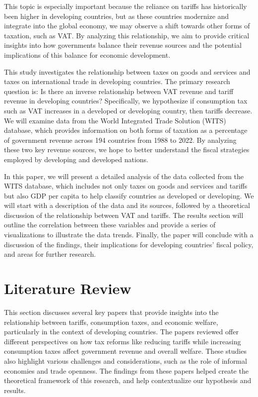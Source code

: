 \documentclass[12pt]{article}
\begin{document}
This topic is especially important because the reliance on tariffs has historically been higher in developing countries, but as these countries modernize and integrate into the global economy, we may observe a shift towards other forms of taxation, such as VAT. By analyzing this relationship, we aim to provide critical insights into how governments balance their revenue sources and the potential implications of this balance for economic development.

This study investigates the relationship between taxes on goods and services and taxes on international trade in developing countries. The primary research question is: Is there an inverse relationship between VAT revenue and tariff revenue in developing countries? Specifically, we hypothesize  if consumption tax such as VAT increases in a developed or developing country, then tariffs decrease. We will examine data from the World Integrated Trade Solution (WITS) database, which provides information on both forms of taxation as a percentage of government revenue across 194 countries from 1988 to 2022. By analyzing these two key revenue sources, we hope to better understand the fiscal strategies employed by developing and developed nations.

In this paper, we will present a detailed analysis of the data collected from the WITS database, which includes not only taxes on goods and services and tariffs but also GDP per capita to help classify countries as developed or developing. We will start with a description of the data and its sources, followed by a theoretical discussion of the relationship between VAT and tariffs. The results section will outline the correlation between these variables and provide a series of visualizations to illustrate the data trends. Finally, the paper will conclude with a discussion of the findings, their implications for developing countries' fiscal policy, and areas for further research.

\section{Literature Review} \label{sec:literature}

This section discusses several key papers that provide insights into the relationship between tariffs, consumption taxes, and economic welfare, particularly in the context of developing countries. The papers reviewed offer different perspectives on how tax reforms like reducing tariffs while increasing consumption taxes affect government revenue and overall welfare. These studies also highlight various challenges and considerations, such as the role of informal economies and trade openness. The findings from these papers helped create the theoretical framework of this research, and help contextualize our hypothesis and results.
\end{document}
